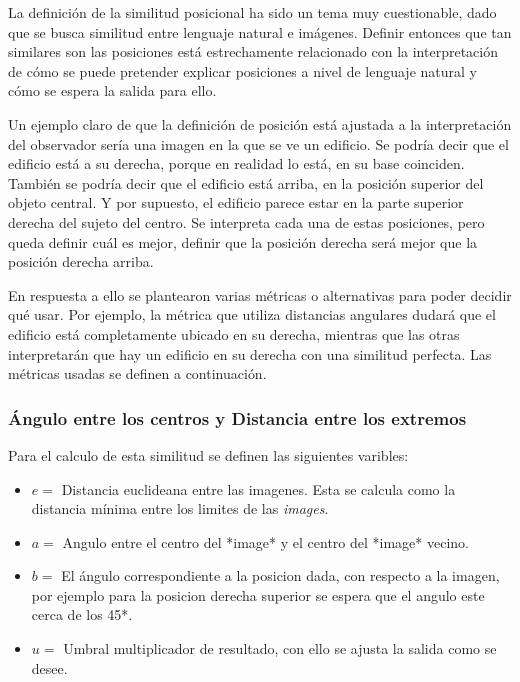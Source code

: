 La definición de la similitud posicional ha sido un tema muy cuestionable, dado que se busca similitud entre lenguaje natural e imágenes. Definir entonces que tan similares son las posiciones está estrechamente relacionado con la interpretación de cómo se puede pretender explicar posiciones a nivel de lenguaje natural y cómo se espera la salida para ello.

Un ejemplo claro de que la definición de posición está ajustada a la interpretación del observador sería una imagen en la que se ve un edificio. Se podría decir que el edificio está a su derecha, porque en realidad lo está, en su base coinciden. También se podría decir que el edificio está arriba, en la posición superior del objeto central. Y por supuesto, el edificio parece estar en la parte superior derecha del sujeto del centro. Se interpreta cada una de estas posiciones, pero queda definir cuál es mejor, definir que la posición derecha será mejor que la posición derecha arriba.

En respuesta a ello se plantearon varias métricas o alternativas para poder decidir qué usar. Por ejemplo, la métrica que utiliza distancias angulares dudará que el edificio está completamente ubicado en su derecha, mientras que las otras interpretarán que hay un edificio en su derecha con una similitud perfecta. Las métricas usadas se definen a continuación.

\subsubsection{Ángulo entre los centros y Distancia entre los extremos}

Para el calculo de esta similitud se definen las siguientes varibles:
\begin{itemize}
    \item $e =$ Distancia euclideana entre las imagenes. Esta se calcula como la distancia m\'inima entre los limites de las \textit{images}.

    \item $a =$ Angulo entre el centro del *image* y  el centro del *image* vecino.

    \item $b =$  El \'angulo correspondiente a la posicion dada, con respecto a la imagen, por ejemplo para la posicion derecha superior se espera que el angulo este cerca de los 45*.

    \item $u =$  Umbral multiplicador de resultado, con ello se ajusta la salida como se desee.
\end{itemize}

